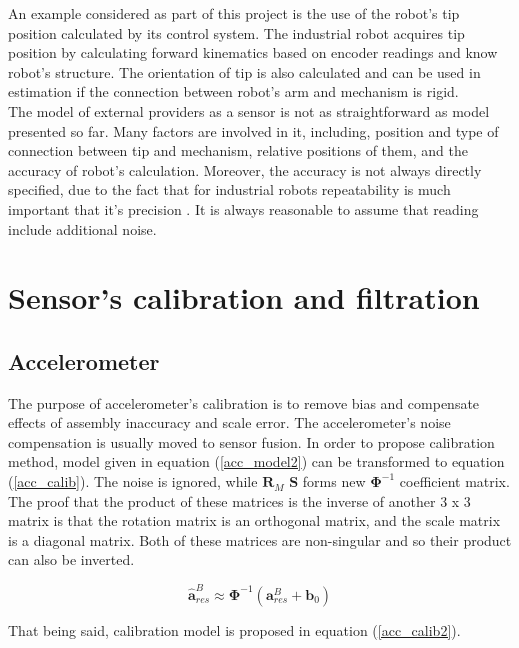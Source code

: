 An example considered as part of this project is the use of the robot's tip position calculated by its control system. The industrial robot acquires tip position by calculating forward kinematics based on encoder readings and know robot's structure. The orientation of tip is also calculated and can be used in estimation if the connection between robot's arm and mechanism is rigid.\\

The model of external providers as a sensor is not as straightforward as model presented so far. Many factors are involved in it, including, position and type of connection between tip and mechanism, relative positions of them, and the accuracy of robot's calculation. Moreover, the accuracy is not always directly specified, due to the fact that for industrial robots repeatability is much important that it's precision \cite{shiakolas2002accuracy}.
It is always reasonable to assume that reading include additional noise.

\section{Sensor's calibration and filtration}



\subsection{Accelerometer}

The purpose of accelerometer's calibration is to remove bias and compensate effects of assembly inaccuracy and scale error. The accelerometer's noise compensation is usually moved to sensor fusion. In order to propose calibration method, model given in equation (\ref{acc_model2}) can be transformed to equation (\ref{acc_calib}). The noise is ignored, while $\bm{R}_M$ $\bm{S}$ forms new $\bm{\Phi}^{-1}$ coefficient matrix. The proof that the product of these matrices is the inverse of another 3 x 3 matrix is that the rotation matrix is an orthogonal matrix, and the scale matrix is a diagonal matrix. Both of these matrices are non-singular and so their product can also be inverted.

\begin{equation}
	\bm{\hat{a}}_{res}^B \approx \bm{\Phi}^{-1} \left( \bm{a}_{res}^B + \bm{b}_0 \right)
	\label{acc_calib}
\end{equation}

That being said, calibration model is proposed in equation (\ref{acc_calib2}).

